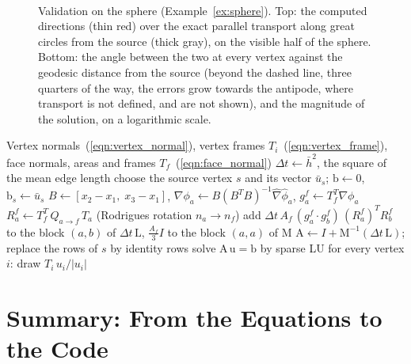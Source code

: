 \begin{figure}[t]
\centering
{}\\[6pt]

\caption{Validation on the sphere (Example~\ref{ex:sphere}). Top: the computed directions (thin red) over the exact parallel transport along great circles from the source (thick gray), on the visible half of the sphere. Bottom: the angle between the two at every vertex against the geodesic distance from the source (beyond the dashed line, three quarters of the way, the errors grow towards the antipode, where transport is not defined, and are not shown), and the magnitude of the solution, on a logarithmic scale.}
\label{fig:sphere}
\end{figure}

\begin{algorithm}[t]
\caption{Parallel transport of a tangent vector by one step of the vector heat equation ( of ).}
\label{alg:fem}
\begin{algorithmic}[1]
\STATE Vertex normals~(\ref{eqn:vertex_normal}), vertex frames $T_i$~(\ref{eqn:vertex_frame}), face normals, areas and frames $T_f$~(\ref{eqn:face_normal})
\STATE $\Delta t \leftarrow \bar h^2$, the square of the mean edge length
\STATE choose the source vertex $s$ and its vector $\bar u_s$; $\mathrm b \leftarrow 0$, $\mathrm b_s \leftarrow \bar u_s$
  \STATE $B \leftarrow [x_2 - x_1, \; x_3 - x_1]$, \quad $\nabla \phi_a \leftarrow B (B^T B)^{-1} \hat\nabla \hat\phi_a$, \quad $g_a^f \leftarrow T_f^T \nabla \phi_a$
  \STATE $R_a^f \leftarrow T_f^T\, Q_{a \to f}\, T_a$ \hfill (Rodrigues rotation $n_a \to n_f$)
  \STATE add $\Delta t\, A_f\, (g_a^f \cdot g_b^f)\, (R_a^f)^T R_b^f$ to the block $(a, b)$ of $\Delta t\, \mathrm L$, \quad $\frac{A_f}{3} I$ to the block $(a, a)$ of $\mathrm M$
\ENDFOR
\STATE $\mathrm A \leftarrow I + \mathrm M^{-1} (\Delta t\, \mathrm L)$; replace the rows of $s$ by identity rows
\STATE solve $\mathrm A\, \mathrm u = \mathrm b$ by sparse LU
\STATE for every vertex $i$: draw $T_i\, u_i / |u_i|$
\end{algorithmic}
\end{algorithm}

\section{Summary: From the Equations to the Code}
\label{section:summary}

